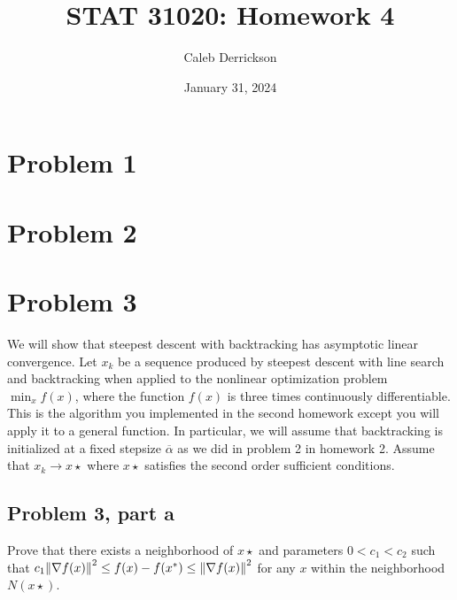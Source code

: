 



\title{STAT 31020: Homework 4}
\author{Caleb Derrickson}
\date{January 31, 2024}


\onehalfspacing
\maketitle
\allowdisplaybreaks
\tableofcontents

\newpage
\section{Problem 1}


\newpage
\section{Problem 2}

\newpage
\section{Problem 3}
\newcommand{\alphabar}{\overline{\alpha}}
We will show that steepest descent with backtracking has asymptotic linear convergence. Let $x_k$ be a sequence produced by steepest descent with line search and backtracking when applied to the nonlinear optimization problem $\min_{x} f(x)$, where the function $f(x)$ is three times continuously differentiable. This is the algorithm you implemented in the second homework except you will apply it to a general function. In particular, we will assume that backtracking is initialized at a fixed stepsize $\alphabar$ as we did in problem 2 in homework 2. Assume that $x_k \rightarrow x\star$ where $x\star$ satisfies the second order sufficient conditions. 

\subsection{Problem 3, part a}
Prove that there exists a neighborhood of $x\star$ and parameters $0 < c_1 < c_2$ such that $c_1 \norm{\nabla f(x)}^2 \leq f(x) - f(x^{*}) \leq \norm{\nabla f(x)}^2$ for any $x$ within the neighborhood $N(x\star)$.
\partbreak

